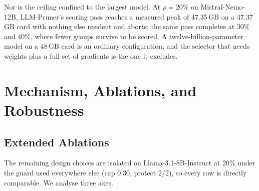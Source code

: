 Nor is the ceiling confined to the largest model. At $\rho{=}20\%$ on Mistral-Nemo-12B, LLM-Pruner's
scoring pass reaches a measured peak of $47.35$\,GB on a $47.37$\,GB card with nothing else resident
and aborts; the same pass completes at $30\%$ and $40\%$, where fewer groups survive to be scored.
A twelve-billion-parameter model on a $48$\,GB card is an ordinary configuration, and the selector
that needs weights plus a full set of gradients is the one it excludes.

\begin{table}[htbp]
\centering
\caption{\textbf{Where each selector stops, and what it costs per operating point.} Peak memory
decides which methods run at $24$B as published, and the $24$B failures are measured rather than
extrapolated (A100-80GB, $128$\,GB host). $W$ is one copy of the weights. \emph{Once} is the
selection pass on Llama-3.1-8B-Instruct on one RTX 6000 Ada; \emph{per point} divides it over the five
compression ratios each method is reported at, which is the comparable quantity because $\Hmat$ does
not depend on the ratio while a layer-wise selector is re-run at every one.}
\label{tab:selcost}

\end{table}


\section{Mechanism, Ablations, and Robustness}
\label{app:analysis}

\subsection{Extended Ablations}

\label{app:ablation-extra}

\begin{table}[htbp]
\centering\footnotesize
\caption{\textbf{Restricting the eligible units to one module type} at a $20\%$ target, under the
same guard, the same $\hat\lambda$ and the same layer protection as everywhere else. \emph{attn/FFN}
counts how the removed units divide between attention units and FFN groups. Attention alone cannot
reach the budget on Falcon3-7B, which has four attention units per layer: it stops at $9.1\%$, and
what it does remove is catastrophic. On Llama-3.2-3B it does reach the target, at $28\times$ the joint
arm's perplexity. The Falcon3-7B row pair is not a comparison: the joint objective spends nothing on
attention there, so its mask \emph{is} the FFN-only mask, which is why the two rows agree to the digit.
The comparison lives on Llama-3.2-3B, where the joint arm removes $38$ attention units and leads on the
capability group. Best in column in bold.}
\label{tab:singlemodule}

\end{table}
The remaining design choices are isolated on Llama-3.1-8B-Instruct at $20\%$ under the guard used
everywhere else (cap $0.30$, protect $2/2$), so every row is directly comparable. We analyse three
axes.


